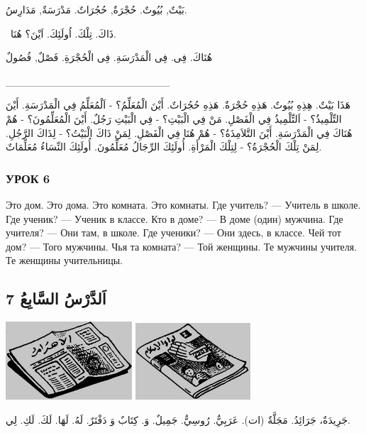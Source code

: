 \documentclass[a5paper]{article}
\begin{document}
بَيْتٌ, بُيُوتٌ. حُجْرَةٌ, حُجُرَاتٌ. مَدْرَسَةٌ, مَدَارِسُ. 

\ ذَاكَ. تِلْكَ. اُولَئِكَ. اَيْنَ؟ هُنَا.

هُنَاكَ. فِى. فِى الْمَدْرَسَةِ. فِى الْحُجْرَةِ. فَصْلٌ, فُصُولٌ

\_\_\_\_\_\_\_\_\_\_\_\_\_\_\_\_\_\_\_\_\_\_

هَذَا بَيْتٌ. هِذِهِ بُيُوتٌ. هَذِهِ حُجْرَةٌ. هَذِهِ حُجُرَاتٌ. أَيْنَ الْمُعَلِّمُ؟ - اَلْمُعَلِّمُ فِي الْمَدْرَسَةِ. أَيْنَ التِّلْمِيذُ؟ - اَلتِّلْمِيذُ فِي الْفَصْلِ. مَنْ فِي الْبَيْتِ؟ - فِي الْبَيْتِ رَجُلٌ. أَيْنَ الْمُعَلِّمُونَ؟ - هُمْ هُنَاكَ فِي الْمَدْرَسَةِ. أَيْنَ التَّلاَمِذَةُ؟ - هُمْ هُنَا فِي الْفَصْلِ. لِمَنْ ذَاكَ الْبَيْتُ؟ - لِذَاكَ الرَّجُلِ. لِمَنْ تِلْكَ الْحُجْرَةُ؟ - لِتِلْكَ الْمَرْأَةِ. أُولَئِكَ الرِّجَالُ مُعَلِّمُونَ. أُولَئِكَ النِّسَاءُ مُعَلِّمَاتٌ.

\subsubsection{УРОК 6}
Это дом. Это дома. Это комната. Это комнаты. Где учитель? — Учитель в школе. Где ученик? — Ученик в классе. Кто в доме? — В доме (один) мужчина. Где учителя? — Они там, в школе. Где ученики? — Они здесь, в классе. Чей тот дом? — Того мужчины. Чья та комната? — Той женщины. Те мужчины учителя. Те женщины учительницы.

\subsection{7 اَلدَّرْسُ السَّابِعُ}
 \includegraphics[width=1.8543in,height=1.1457in]{images/MuhammadBagauddinprettified-img009.jpg}   \includegraphics[width=1.6874in,height=1.1252in]{images/MuhammadBagauddinprettified-img010.jpg} 

جَرِيدَةٌ، جَرَائِدُ. مَجَلَّةٌ (ات). عَرَبِيٌّ. رُوسِيٌّ. جَمِيلٌ. وَ. كِتَابٌ وَ دَفْتَرٌ. لَهُ. لَهَا. لَكَ. لَكِ. لِي.
\end{document}
